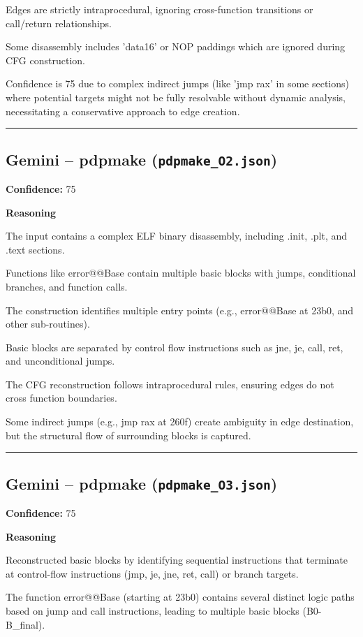 Edges are strictly intraprocedural, ignoring cross-function transitions or call/return relationships.

Some disassembly includes 'data16' or NOP paddings which are ignored during CFG construction.

Confidence is 75 due to complex indirect jumps (like 'jmp rax' in some sections) where potential targets might not be fully resolvable without dynamic analysis, necessitating a conservative approach to edge creation.

\bigskip
\hrule
\bigskip

\subsection{Gemini -- pdpmake (\texttt{pdpmake\_O2.json})}

\textbf{Confidence:} 75

\textbf{Reasoning}

The input contains a complex ELF binary disassembly, including .init, .plt, and .text sections.

Functions like error@@Base contain multiple basic blocks with jumps, conditional branches, and function calls.

The construction identifies multiple entry points (e.g., error@@Base at 23b0, and other sub-routines).

Basic blocks are separated by control flow instructions such as jne, je, call, ret, and unconditional jumps.

The CFG reconstruction follows intraprocedural rules, ensuring edges do not cross function boundaries.

Some indirect jumps (e.g., jmp rax at 260f) create ambiguity in edge destination, but the structural flow of surrounding blocks is captured.

\bigskip
\hrule
\bigskip

\subsection{Gemini -- pdpmake (\texttt{pdpmake\_O3.json})}

\textbf{Confidence:} 75

\textbf{Reasoning}

Reconstructed basic blocks by identifying sequential instructions that terminate at control-flow instructions (jmp, je, jne, ret, call) or branch targets.

The function error@@Base (starting at 23b0) contains several distinct logic paths based on jump and call instructions, leading to multiple basic blocks (B0-B\_final).

